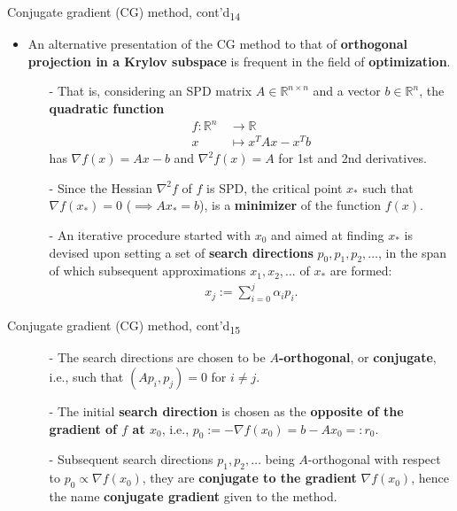 \documentclass[t,usepdftitle=false]{beamer}
\begin{document}
\begin{frame}{Conjugate gradient (CG) method, cont'd\textsubscript{14}}
\begin{itemize}
\item An alternative presentation of the CG method to that of \textbf{orthogonal projection in a Krylov subspace} is frequent in the field of \textbf{optimization}.
\begin{itemize}\normalsize
\item[-] That is, considering an SPD matrix $A\in\mathbb{R}^{n\times n}$ and a vector $b\in\mathbb{R}^n$, the \textbf{quadratic function}
\begin{align*}
f:
\mathbb{R}^n&\,\rightarrow\mathbb{R}\\
x&\,\mapsto x^TAx-x^Tb
\end{align*} 
has $\nabla f(x)=Ax-b$ and $\nabla^2f(x)=A$ for 1st and 2nd derivatives.
\item[-] Since the Hessian $\nabla^2f$ of $f$ is SPD, the critical point $x_*$ such that $\nabla f(x_*)=0$ ($\implies Ax_*=b$), is a \textbf{minimizer} of the function $f(x)$.
\item[-] An iterative procedure started with $x_0$ and aimed at finding $x_*$ is devised upon setting a set of \textbf{search directions} $p_0,p_1,p_2,\dots$, in the span of which subsequent approximations $x_1,x_2,\dots$ of $x_*$ are formed:
\begin{align*}
x_j:=\sum_{i=0}^j\alpha_ip_i.
\end{align*}
\end{itemize}
\end{itemize}
\end{frame}

\begin{frame}{Conjugate gradient (CG) method, cont'd\textsubscript{15}}
\begin{itemize}
\item[]
\begin{itemize}\normalsize
\item[-] The search directions are chosen to be $A$\textbf{-orthogonal}, or \textbf{conjugate}, i.e., such that $(Ap_i,p_j)=0$ for $i\neq j$.
\item[-] The initial \textbf{search direction} is chosen as the \textbf{opposite of the gradient of $f$ at $x_0$}, i.e., $p_0:=-\nabla f(x_0)=b-Ax_0=:r_0$.
\item[-] Subsequent search directions $p_1,p_2,\dots$ being $A$-orthogonal with respect to $p_0\propto \nabla f(x_0)$, they are \textbf{conjugate to the gradient} $\nabla f(x_0)$, hence the name \textbf{conjugate gradient} given to the method.
\end{itemize}
\end{itemize}
\end{frame}
\end{document}
